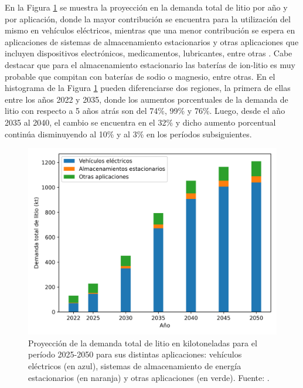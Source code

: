 En la Figura \ref{fig:iea-Li} se muestra la proyección en la demanda total de 
litio por año y por aplicación, donde la mayor contribución se encuentra para la 
utilización del mismo en vehículos eléctricos, mientras que una menor contribución 
se espera en aplicaciones de sistemas de almacenamiento estacionarios y otras 
aplicaciones que incluyen dispositivos electrónicos, medicamentos, lubricantes, 
entre otras \cite{IEA}. Cabe destacar que para el almacenamiento estacionario 
las baterías de ion-litio es muy probable que compitan con baterías de sodio o magnesio, entre 
otras. En el histograma de la Figura \ref{fig:iea-Li} pueden diferenciarse dos 
regiones, la primera de ellas entre los años 2022 y 2035, donde los aumentos
porcentuales de la demanda de litio con respecto a 5 años atrás son del 74\%, 
99\% y 76\%. Luego, desde el año 2035 al 2040, el cambio se encuentra en el 32\% y
dicho aumento porcentual continúa disminuyendo al 10\% y al 3\% en los períodos 
subsiguientes.
\begin{figure}[h!]
    \centering
    \includegraphics[width=.8\textwidth]{Introduccion/energia/iea-Li.png}
    \caption{Proyección de la demanda total de litio en kilotoneladas para el 
    período 2025-2050 para sus distintas aplicaciones: vehículos eléctricos (en 
    azul), sistemas de almacenamiento de energía estacionarios (en naranja) y
    otras aplicaciones (en verde). Fuente: \cite{IEA}.}
    \label{fig:iea-Li}
\end{figure}

